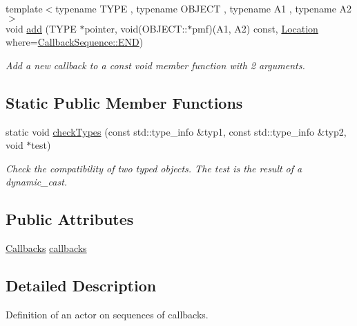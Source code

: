 \begin{DoxyCompactItemize}
{\footnotesize template$<$typename T\+Y\+PE , typename O\+B\+J\+E\+CT , typename A1 , typename A2 $>$ }\\void \hyperlink{struct_d_d4hep_1_1_callback_sequence_a7fb3e260fa9f1c3d83a1744a610061a8}{add} (T\+Y\+PE $\ast$pointer, void(O\+B\+J\+E\+C\+T\+::$\ast$pmf)(A1, A2) const, \hyperlink{struct_d_d4hep_1_1_callback_sequence_a7753490247479633aed16a2376821ef7}{Location} where=\hyperlink{struct_d_d4hep_1_1_callback_sequence_a7753490247479633aed16a2376821ef7ac39eeb1bcfc1c235ab1d0d9315c310ac}{Callback\+Sequence\+::\+E\+ND})
\begin{DoxyCompactList}\small\item\em Add a new callback to a const void member function with 2 arguments. \end{DoxyCompactList}\end{DoxyCompactItemize}
\subsection*{Static Public Member Functions}
\begin{DoxyCompactItemize}
\item 
static void \hyperlink{struct_d_d4hep_1_1_callback_sequence_a79ff90bc3241fad2b0eafd5adb4dee86}{check\+Types} (const std\+::type\+\_\+info \&typ1, const std\+::type\+\_\+info \&typ2, void $\ast$test)
\begin{DoxyCompactList}\small\item\em Check the compatibility of two typed objects. The test is the result of a dynamic\+\_\+cast. \end{DoxyCompactList}\end{DoxyCompactItemize}
\subsection*{Public Attributes}
\begin{DoxyCompactItemize}
\item 
\hyperlink{struct_d_d4hep_1_1_callback_sequence_a2d9d9488b193731498c4b9cc0fdc4a6b}{Callbacks} \hyperlink{struct_d_d4hep_1_1_callback_sequence_a76c6c81bd2cd430ca45bde9206fb1839}{callbacks}
\end{DoxyCompactItemize}


\subsection{Detailed Description}
Definition of an actor on sequences of callbacks. 

